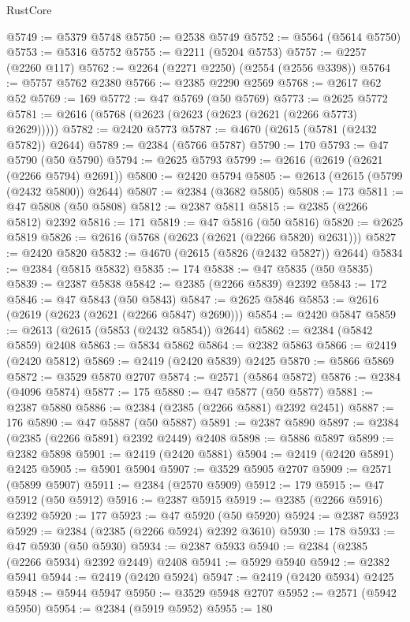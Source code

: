 \begin{lexlean}{RustCore}
\begin{coremodule}
@5749 := @5379 @5748
@5750 := @2538 @5749
@5752 := @5564 (@5614 @5750)
@5753 := @5316 @5752
@5755 := @2211 (@5204 @5753)
@5757 := @2257 (@2260 @117)
@5762 := @2264 (@2271 @2250) (@2554 (@2556 @3398))
@5764 := @5757 @5762 @2380
@5766 := @2385 @2290 @2569
@5768 := @2617 @62 @52
@5769 := 169
@5772 := @47 @5769 (@50 @5769)
@5773 := @2625 @5772
@5781 := @2616 (@5768 (@2623 (@2623 (@2623 (@2621 (@2266 @5773) @2629)))))
@5782 := @2420 @5773
@5787 := @4670 (@2615 (@5781 (@2432 @5782)) @2644)
@5789 := @2384 (@5766 @5787)
@5790 := 170
@5793 := @47 @5790 (@50 @5790)
@5794 := @2625 @5793
@5799 := @2616 (@2619 (@2621 (@2266 @5794) @2691))
@5800 := @2420 @5794
@5805 := @2613 (@2615 (@5799 (@2432 @5800)) @2644)
@5807 := @2384 (@3682 @5805)
@5808 := 173
@5811 := @47 @5808 (@50 @5808)
@5812 := @2387 @5811
@5815 := @2385 (@2266 @5812) @2392
@5816 := 171
@5819 := @47 @5816 (@50 @5816)
@5820 := @2625 @5819
@5826 := @2616 (@5768 (@2623 (@2621 (@2266 @5820) @2631)))
@5827 := @2420 @5820
@5832 := @4670 (@2615 (@5826 (@2432 @5827)) @2644)
@5834 := @2384 (@5815 @5832)
@5835 := 174
@5838 := @47 @5835 (@50 @5835)
@5839 := @2387 @5838
@5842 := @2385 (@2266 @5839) @2392
@5843 := 172
@5846 := @47 @5843 (@50 @5843)
@5847 := @2625 @5846
@5853 := @2616 (@2619 (@2623 (@2621 (@2266 @5847) @2690)))
@5854 := @2420 @5847
@5859 := @2613 (@2615 (@5853 (@2432 @5854)) @2644)
@5862 := @2384 (@5842 @5859) @2408
@5863 := @5834 @5862
@5864 := @2382 @5863
@5866 := @2419 (@2420 @5812)
@5869 := @2419 (@2420 @5839) @2425
@5870 := @5866 @5869
@5872 := @3529 @5870 @2707
@5874 := @2571 (@5864 @5872)
@5876 := @2384 (@4096 @5874)
@5877 := 175
@5880 := @47 @5877 (@50 @5877)
@5881 := @2387 @5880
@5886 := @2384 (@2385 (@2266 @5881) @2392 @2451)
@5887 := 176
@5890 := @47 @5887 (@50 @5887)
@5891 := @2387 @5890
@5897 := @2384 (@2385 (@2266 @5891) @2392 @2449) @2408
@5898 := @5886 @5897
@5899 := @2382 @5898
@5901 := @2419 (@2420 @5881)
@5904 := @2419 (@2420 @5891) @2425
@5905 := @5901 @5904
@5907 := @3529 @5905 @2707
@5909 := @2571 (@5899 @5907)
@5911 := @2384 (@2570 @5909)
@5912 := 179
@5915 := @47 @5912 (@50 @5912)
@5916 := @2387 @5915
@5919 := @2385 (@2266 @5916) @2392
@5920 := 177
@5923 := @47 @5920 (@50 @5920)
@5924 := @2387 @5923
@5929 := @2384 (@2385 (@2266 @5924) @2392 @3610)
@5930 := 178
@5933 := @47 @5930 (@50 @5930)
@5934 := @2387 @5933
@5940 := @2384 (@2385 (@2266 @5934) @2392 @2449) @2408
@5941 := @5929 @5940
@5942 := @2382 @5941
@5944 := @2419 (@2420 @5924)
@5947 := @2419 (@2420 @5934) @2425
@5948 := @5944 @5947
@5950 := @3529 @5948 @2707
@5952 := @2571 (@5942 @5950)
@5954 := @2384 (@5919 @5952)
@5955 := 180

\end{coremodule}
\end{lexlean}

